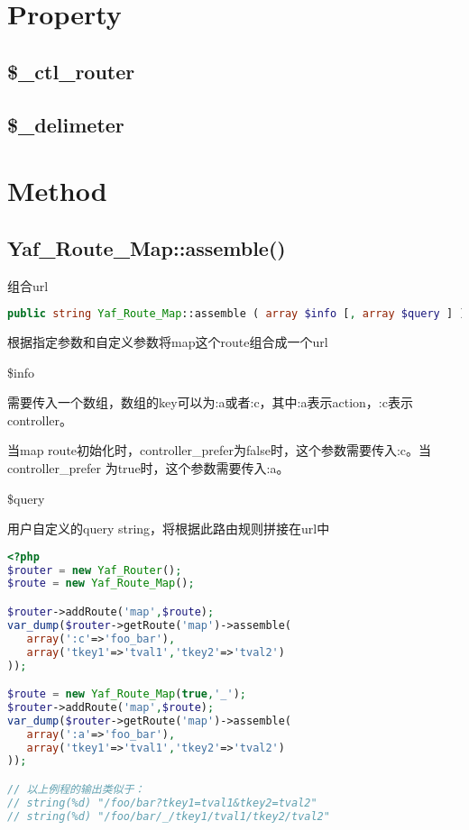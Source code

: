 \section{Property}


\subsection{\$\_ctl\_router}



\subsection{\$\_delimeter}


\section{Method}


\subsection{Yaf\_Route\_Map::assemble()}

组合url

\begin{lstlisting}[language=PHP]
public string Yaf_Route_Map::assemble ( array $info [, array $query ] )
\end{lstlisting}


根据指定参数和自定义参数将map这个route组合成一个url

\begin{compactitem}
\item \$info

需要传入一个数组，数组的key可以为:a或者:c，其中:a表示action，:c表示controller。


当map route初始化时，controller\_prefer为false时，这个参数需要传入:c。当controller\_prefer 为true时，这个参数需要传入:a。

\item \$query

用户自定义的query string，将根据此路由规则拼接在url中

\end{compactitem}

\begin{lstlisting}[language=PHP]
<?php
$router = new Yaf_Router();
$route = new Yaf_Route_Map();

$router->addRoute('map',$route);
var_dump($router->getRoute('map')->assemble(
   array(':c'=>'foo_bar'),
   array('tkey1'=>'tval1','tkey2'=>'tval2')
));

$route = new Yaf_Route_Map(true,'_');
$router->addRoute('map',$route);
var_dump($router->getRoute('map')->assemble(
   array(':a'=>'foo_bar'),
   array('tkey1'=>'tval1','tkey2'=>'tval2')
));

// 以上例程的输出类似于：
// string(%d) "/foo/bar?tkey1=tval1&tkey2=tval2"
// string(%d) "/foo/bar/_/tkey1/tval1/tkey2/tval2"
\end{lstlisting}



